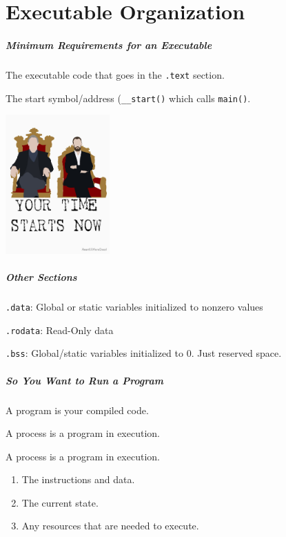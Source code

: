 \part{Executable Organization}

\begin{frame}
\partpage
\end{frame}


\begin{frame}
\frametitle{Minimum Requirements for an Executable}

The executable code that goes in the \texttt{.text} section.

The start symbol/address (\texttt{\_\_start()} which calls \texttt{main()}.

\begin{center}
  \includegraphics[width=0.3\textwidth]{images/taskmaster.jpg}
\end{center}

\end{frame}

\begin{frame}
\frametitle{Other Sections}

\texttt{.data}: Global or static variables initialized to nonzero values

\texttt{.rodata}: Read-Only data

\texttt{.bss}: Global/static variables initialized to 0. Just reserved space.

\end{frame}

\begin{frame}
\frametitle{So You Want to Run a Program}

A \alert{program} is your compiled code.

A \alert{process} is a program in execution. 

	A process is a program in execution.

	\begin{enumerate}
		\item The instructions and data.
		\item The current state.
		\item Any resources that are needed to execute.
	\end{enumerate}

\end{frame}


